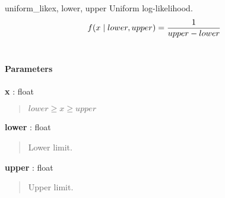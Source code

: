 \hypertarget{pymc.distributions.uniform_like}{}
\begin{funcdesc}{uniform\_like}{x, lower, upper}
Uniform log-likelihood.
\begin{gather}
\begin{split}f(x \mid lower, upper) = \frac{1}{upper-lower}\end{split}\notag\\\begin{split}\end{split}\notag
\end{gather}\paragraph{Parameters}\begin{paramlist}

\item[] \textbf{x} : float
\begin{quote}

$lower \geq x \geq upper$
\end{quote}

\item[] \textbf{lower} : float
\begin{quote}

Lower limit.
\end{quote}

\item[] \textbf{upper} : float
\begin{quote}

Upper limit.
\end{quote}
\end{paramlist}
\end{funcdesc}


